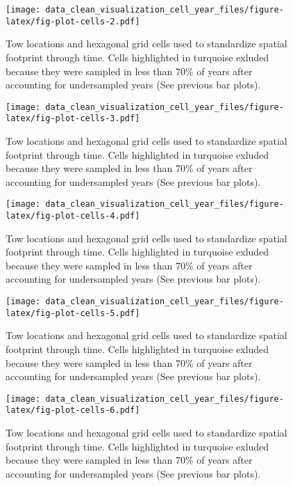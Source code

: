 \documentclass[
]{article}
\begin{document}
\begin{figure}
\centering
\texttt{[image: data\_clean\_visualization\_cell\_year\_files/figure-latex/fig-plot-cells-2.pdf]}
\caption{\label{fig:fig-plot-cells-2}Tow locations and hexagonal grid cells used to standardize spatial footprint through time. Cells highlighted in turquoise exluded because they were sampled in less than 70\% of years after accounting for undersampled years (See previous bar plots).}
\end{figure}

\begin{figure}
\centering
\texttt{[image: data\_clean\_visualization\_cell\_year\_files/figure-latex/fig-plot-cells-3.pdf]}
\caption{\label{fig:fig-plot-cells-3}Tow locations and hexagonal grid cells used to standardize spatial footprint through time. Cells highlighted in turquoise exluded because they were sampled in less than 70\% of years after accounting for undersampled years (See previous bar plots).}
\end{figure}

\begin{figure}
\centering
\texttt{[image: data\_clean\_visualization\_cell\_year\_files/figure-latex/fig-plot-cells-4.pdf]}
\caption{\label{fig:fig-plot-cells-4}Tow locations and hexagonal grid cells used to standardize spatial footprint through time. Cells highlighted in turquoise exluded because they were sampled in less than 70\% of years after accounting for undersampled years (See previous bar plots).}
\end{figure}

\begin{figure}
\centering
\texttt{[image: data\_clean\_visualization\_cell\_year\_files/figure-latex/fig-plot-cells-5.pdf]}
\caption{\label{fig:fig-plot-cells-5}Tow locations and hexagonal grid cells used to standardize spatial footprint through time. Cells highlighted in turquoise exluded because they were sampled in less than 70\% of years after accounting for undersampled years (See previous bar plots).}
\end{figure}

\begin{figure}
\centering
\texttt{[image: data\_clean\_visualization\_cell\_year\_files/figure-latex/fig-plot-cells-6.pdf]}
\caption{\label{fig:fig-plot-cells-6}Tow locations and hexagonal grid cells used to standardize spatial footprint through time. Cells highlighted in turquoise exluded because they were sampled in less than 70\% of years after accounting for undersampled years (See previous bar plots).}
\end{figure}
\end{document}
